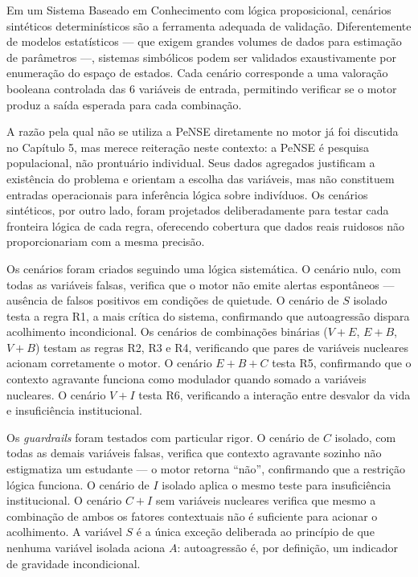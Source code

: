 \documentclass[
    12pt,
    openright,
    oneside,
    a4paper,
    english,
    brazil
]{abntex2}
\begin{document}
Em um Sistema Baseado em Conhecimento com l\'ogica proposicional, cen\'arios sint\'eticos determin\'isticos s\~ao a ferramenta adequada de valida\c{c}\~ao. Diferentemente de modelos estat\'isticos --- que exigem grandes volumes de dados para estima\c{c}\~ao de par\^ametros ---, sistemas simb\'olicos podem ser validados exaustivamente por enumera\c{c}\~ao do espa\c{c}o de estados. Cada cen\'ario corresponde a uma valora\c{c}\~ao booleana controlada das 6 vari\'aveis de entrada, permitindo verificar se o motor produz a sa\'ida esperada para cada combina\c{c}\~ao.

A raz\~ao pela qual n\~ao se utiliza a PeNSE diretamente no motor j\'a foi discutida no Cap\'itulo 5, mas merece reitera\c{c}\~ao neste contexto: a PeNSE \'e pesquisa populacional, n\~ao prontu\'ario individual. Seus dados agregados justificam a exist\^encia do problema e orientam a escolha das vari\'aveis, mas n\~ao constituem entradas operacionais para infer\^encia l\'ogica sobre indiv\'iduos. Os cen\'arios sint\'eticos, por outro lado, foram projetados deliberadamente para testar cada fronteira l\'ogica de cada regra, oferecendo cobertura que dados reais ruidosos n\~ao proporcionariam com a mesma precis\~ao.

Os cen\'arios foram criados seguindo uma l\'ogica sistem\'atica. O cen\'ario nulo, com todas as vari\'aveis falsas, verifica que o motor n\~ao emite alertas espont\^aneos --- aus\^encia de falsos positivos em condi\c{c}\~oes de quietude. O cen\'ario de $S$ isolado testa a regra R1, a mais cr\'itica do sistema, confirmando que autoagress\~ao dispara acolhimento incondicional. Os cen\'arios de combina\c{c}\~oes bin\'arias ($V+E$, $E+B$, $V+B$) testam as regras R2, R3 e R4, verificando que pares de vari\'aveis nucleares acionam corretamente o motor. O cen\'ario $E+B+C$ testa R5, confirmando que o contexto agravante funciona como modulador quando somado a vari\'aveis nucleares. O cen\'ario $V+I$ testa R6, verificando a intera\c{c}\~ao entre desvalor da vida e insufici\^encia institucional.

Os \textit{guardrails} foram testados com particular rigor. O cen\'ario de $C$ isolado, com todas as demais vari\'aveis falsas, verifica que contexto agravante sozinho n\~ao estigmatiza um estudante --- o motor retorna ``n\~ao'', confirmando que a restri\c{c}\~ao l\'ogica funciona. O cen\'ario de $I$ isolado aplica o mesmo teste para insufici\^encia institucional. O cen\'ario $C+I$ sem vari\'aveis nucleares verifica que mesmo a combina\c{c}\~ao de ambos os fatores contextuais n\~ao \'e suficiente para acionar o acolhimento. A vari\'avel $S$ \'e a \'unica exce\c{c}\~ao deliberada ao princ\'ipio de que nenhuma vari\'avel isolada aciona $A$: autoagress\~ao \'e, por defini\c{c}\~ao, um indicador de gravidade incondicional.
\end{document}
